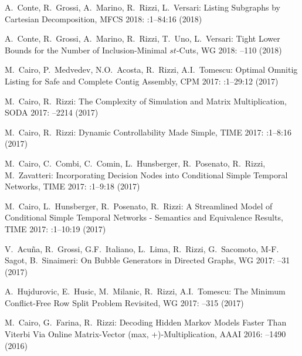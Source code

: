 \begin{etaremune}
  \item {\sc A.~Conte, R.~Grossi, A.~Marino, R.~Rizzi, L.~Versari:}
   \newblock Listing Subgraphs by Cartesian Decomposition,
   \newblock MFCS 2018:
   :1--84:16 (2018)

  \item {\sc A.~Conte, R.~Grossi, A.~Marino, R.~Rizzi, T.~Uno, L.~Versari:}
   \newblock Tight Lower Bounds for the Number of Inclusion-Minimal $st$-Cuts,
   \newblock WG 2018:
   --110 (2018)
   
  \item {\sc M.~Cairo, P.~Medvedev, N.O.~Acosta, R.~Rizzi, A.I.~Tomescu:}
   \newblock Optimal Omnitig Listing for Safe and Complete Contig Assembly,
   \newblock CPM 2017:
   :1--29:12 (2017)

  \item {\sc M.~Cairo, R.~Rizzi:}
   \newblock The Complexity of Simulation and Matrix Multiplication,
   \newblock SODA 2017:
   --2214 (2017)

  \item {\sc M.~Cairo, R.~Rizzi:}
   \newblock Dynamic Controllability Made Simple,
   \newblock TIME 2017:
   :1--8:16 (2017)

  \item {\sc M.~Cairo, C.~Combi, C.~Comin, L.~Hunsberger, R.~Posenato, R.~Rizzi, M.~Zavatteri:}
   \newblock Incorporating Decision Nodes into Conditional Simple Temporal Networks,
   \newblock TIME 2017:
   :1--9:18 (2017)

  \item {\sc M.~Cairo, L.~Hunsberger, R.~Posenato, R.~Rizzi:}
   \newblock A Streamlined Model of Conditional Simple Temporal Networks - Semantics and Equivalence Results,
   \newblock TIME 2017:
   :1--10:19 (2017)

  \item {\sc V.~Acu\~na, R.~Grossi, G.F.~Italiano, L.~Lima, R.~Rizzi, G.~Sacomoto, M-F. Sagot, B.~Sinaimeri:}
   \newblock On Bubble Generators in Directed Graphs,
   \newblock  WG 2017:
   --31 (2017)

  \item {\sc A.~Hujdurovic, E.~Husic, M.~Milanic, R.~Rizzi, A.I.~Tomescu:}
   \newblock The Minimum Conflict-Free Row Split Problem Revisited,
   \newblock  WG 2017:
   --315 (2017)

  \item {\sc M.~Cairo, G.~Farina, R.~Rizzi:}
   \newblock Decoding Hidden Markov Models Faster Than Viterbi Via Online Matrix-Vector (max, +)-Multiplication,
   \newblock AAAI 2016:
   --1490 (2016)


\end{etaremune}

